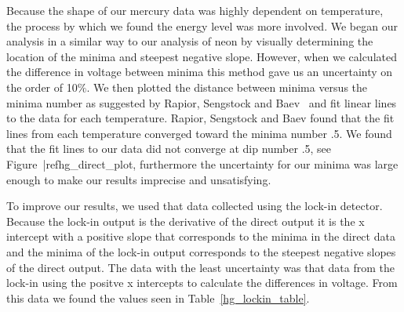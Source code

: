 \documentclass[prb,preprint]{revtex4-1}
\begin{document}
Because the shape of our mercury data was highly dependent on temperature, the process by which we found the energy level was more involved. We began our analysis in a similar way to our analysis of neon by visually determining the location of the minima and steepest negative slope. However, when we calculated the difference in voltage between minima this method gave us an uncertainty on the order of 10$\%$. We then plotted the distance between minima versus the minima number as suggested by Rapior, Sengstock and Baev~\cite{newfeatures} and fit linear lines to the data for each temperature. Rapior, Sengstock and Baev found that the fit lines from each temperature converged toward the minima number .5. We found that the fit lines to our data did not converge at dip number .5, see Figure~|ref{hg_direct_plot}, furthermore the uncertainty for our minima was large enough to make our results imprecise and unsatisfying.

To improve our results, we used that data collected using the lock-in detector. Because the lock-in output is the derivative of the direct output it is the x intercept with a positive slope that corresponds to the minima in the direct data and the minima of the lock-in output corresponds to the steepest negative slopes of the direct output. The data with the least uncertainty was that data from the lock-in using the positve x intercepts to calculate the differences in voltage. From this data we found the values seen in Table~\ref{hg_lockin_table}.
\end{document}
